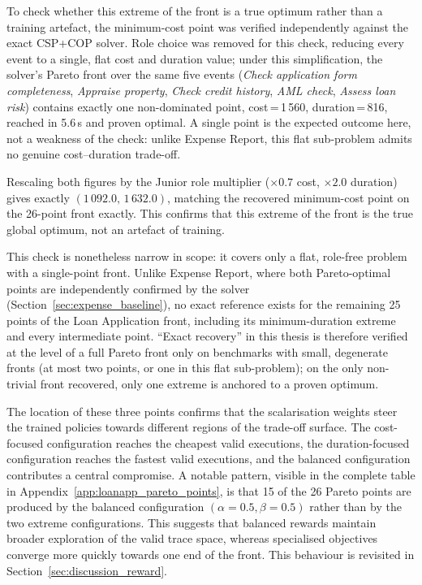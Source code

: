To check whether this extreme of the front is a true optimum rather
than a training artefact, the minimum-cost point was verified
independently against the exact CSP+COP solver. Role choice was
removed for this check, reducing every event to a single, flat cost
and duration value; under this simplification, the solver's Pareto
front over the same five events (\textit{Check application form
completeness}, \textit{Appraise property}, \textit{Check credit
history}, \textit{AML check}, \textit{Assess loan risk}) contains
exactly one non-dominated point, cost\,=\,1\,560, duration\,=\,816,
reached in 5.6\,s and proven optimal. A single point is the expected
outcome here, not a weakness of the check: unlike Expense Report,
this flat sub-problem admits no genuine cost--duration trade-off.

Rescaling both figures by the Junior role multiplier ($\times0.7$
cost, $\times2.0$ duration) gives exactly $(1\,092.0,\,1\,632.0)$,
matching the recovered minimum-cost point on the 26-point front
exactly. This confirms that this extreme of the front is the true
global optimum, not an artefact of training.

This check is nonetheless narrow in scope: it covers only a flat,
role-free problem with a single-point front. Unlike Expense Report,
where both Pareto-optimal points are independently confirmed by the
solver (Section~\ref{sec:expense_baseline}), no exact reference exists
for the remaining 25 points of the Loan Application front, including
its minimum-duration extreme and every intermediate point. ``Exact
recovery'' in this thesis is therefore verified at the level of a
full Pareto front only on benchmarks with small, degenerate fronts (at
most two points, or one in this flat sub-problem); on the only
non-trivial front recovered, only one extreme is anchored to a proven
optimum.


The location of these three points confirms that the scalarisation
weights steer the trained policies towards different regions of the
trade-off surface. The cost-focused configuration reaches the cheapest
valid executions, the duration-focused configuration reaches the
fastest valid executions, and the balanced configuration contributes a
central compromise. A notable pattern, visible in the complete table in
Appendix~\ref{app:loanapp_pareto_points}, is that 15 of the 26 Pareto
points are produced by the balanced configuration
$(\alpha=0.5,\beta=0.5)$ rather than by the two extreme configurations.
This suggests that balanced rewards maintain broader exploration of the
valid trace space, whereas specialised objectives converge more quickly
towards one end of the front. This behaviour is revisited in
Section~\ref{sec:discussion_reward}.

